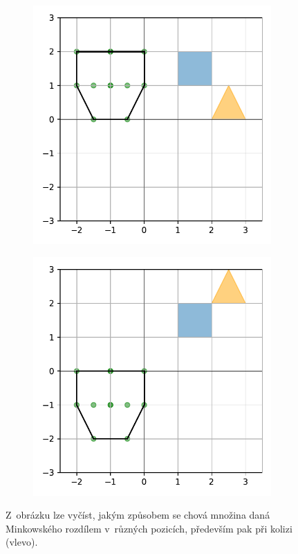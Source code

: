 \begin{figure}
\begin{subfigure}[t]{0.29\textwidth}
    \centering
    \includegraphics[scale=0.5]{obrazky-figures/gjk/minkowksi_notoverlap.pdf}

    
\end{subfigure}
\hfill
\begin{subfigure}[t]{0.29\textwidth}
    
    \centering
    \includegraphics[scale=0.5]{obrazky-figures/gjk/minkowksi_notoverlap2.pdf}
    
\end{subfigure}

   \caption{Z~obrázku lze vyčíst, jakým způsobem se chová množina daná Minkowského rozdílem v~různých pozicích, především pak při kolizi (vlevo).
   } 
    \label{fig:minikowski-kolizion}

\end{figure}

